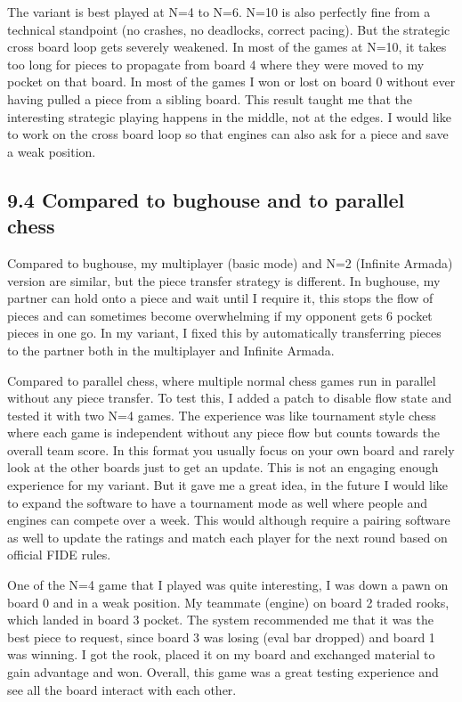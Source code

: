 \documentclass[11pt,a4paper]{article}
\begin{document}
The variant is best played at N=4 to N=6. N=10 is also perfectly fine from a technical standpoint (no crashes, no deadlocks, correct pacing). But the strategic cross board loop gets severely weakened. In most of the games at N=10, it takes too long for pieces to propagate from board 4 where they were moved to my pocket on that board. In most of the games I won or lost on board 0 without ever having pulled a piece from a sibling board. This result taught me that the interesting strategic playing happens in the middle, not at the edges. I would like to work on the cross board loop so that engines can also ask for a piece and save a weak position.

\subsection*{9.4 Compared to bughouse and to parallel chess}

Compared to bughouse, my multiplayer (basic mode) and N=2 (Infinite Armada) version are similar, but the piece transfer strategy is different. In bughouse, my partner can hold onto a piece and wait until I require it, this stops the flow of pieces and can sometimes become overwhelming if my opponent gets 6 pocket pieces in one go. In my variant,  I fixed this by automatically transferring pieces to the partner both in the multiplayer and Infinite Armada. 

Compared to parallel chess, where multiple normal chess games run in parallel without any piece transfer. To test this, I added a patch to disable flow state and tested it with two N=4 games. The experience was like tournament style chess where each game is independent without any piece flow but counts towards the overall team score. In this format you usually focus on your own board and rarely look at the other boards just to get an update. This is not an engaging enough experience for my variant. But it gave me a great idea, in the future I would like to expand the software to have a tournament mode as well where people and engines can compete over a week. This would although require a pairing software as well to update the ratings and match each player for the next round based on official FIDE rules.

One of the N=4 game that I played was quite interesting, I was down a pawn on board 0 and in a weak position. My teammate (engine) on board 2 traded rooks, which landed in board 3 pocket. The system recommended  me that it was the best piece to request, since board 3 was losing (eval bar dropped) and board 1 was winning. I got the rook, placed it on my board and exchanged material to gain advantage and won. Overall, this game was a great testing experience and see all the board interact with each other.
\end{document}
